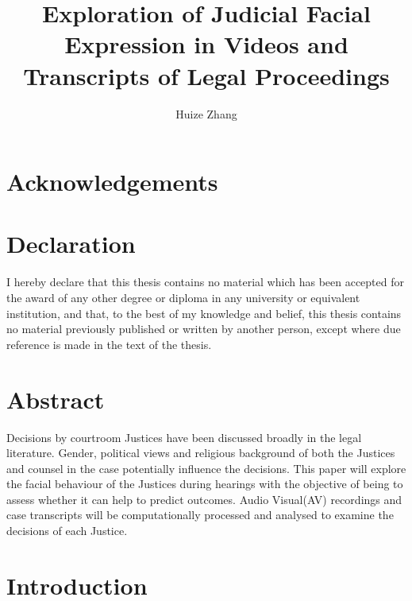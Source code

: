 \documentclass{monashthesis}
\author{Huize Zhang}
\title{Exploration of Judicial Facial Expression in Videos and Transcripts of Legal Proceedings}
\begin{document}

\titlepage

{\sf\tighttoc\doublespacing}

\setcounter{page}{0}

\hypertarget{acknowledgements}{%
\chapter*{Acknowledgements}\label{acknowledgements}}

\hypertarget{declaration}{%
\chapter*{Declaration}\label{declaration}}

I hereby declare that this thesis contains no material which has been accepted for the award of any other degree or diploma in any university or equivalent institution, and that, to the best of my knowledge and belief, this thesis contains no material previously published or written by another person, except where due reference is made in the text of the thesis.

\vspace*{2cm}\par\authorname

\hypertarget{abstract}{%
\chapter*{Abstract}\label{abstract}}

Decisions by courtroom Justices have been discussed broadly in the legal literature. Gender, political views and religious background of both the Justices and counsel in the case potentially influence the decisions. This paper will explore the facial behaviour of the Justices during hearings with the objective of being to assess whether it can help to predict outcomes. Audio Visual(AV) recordings and case transcripts will be computationally processed and analysed to examine the decisions of each Justice.

\clearpage{}\setcounter{page}{1}

\hypertarget{ch:intro}{%
\chapter{Introduction}\label{ch:intro}}
\end{document}
